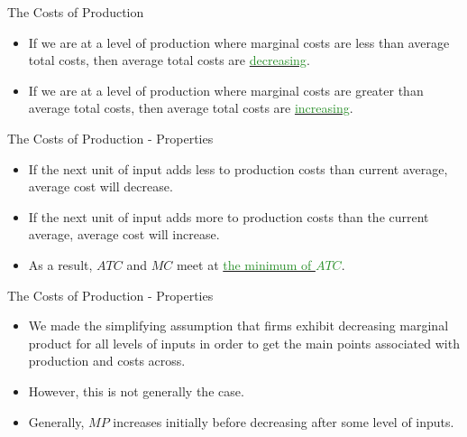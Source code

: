\documentclass[xcolor={dvipsnames},pdf, hyperref={colorlinks=true, citecolor=ForestGreen, linkcolor=BlueViolet, urlcolor=Magenta}]{beamer}
\newcommand{\dd}[1]{{\underline{\textcolor{ForestGreen}{#1}}}}
\begin{document}
\begin{frame}{The Costs of Production}
\begin{itemize}
	\item If we are at a level of production where marginal costs are less than average total costs, then average total costs are \dd{decreasing}.
	\item If we are at a level of production where marginal costs are greater than average total costs, then average total costs are \dd{increasing}.
\end{itemize}
\end{frame}

\begin{frame}{The Costs of Production - Properties}
	\begin{itemize}
		\item If the next unit of input adds less to production costs than current average, average cost will decrease. 
		\item If the next unit of input adds more to production costs than the current average, average cost will increase.
		\item As a result, $ATC$ and $MC$ meet at \dd{the minimum of $ATC$}.
	\end{itemize}
\end{frame}

\begin{frame}{The Costs of Production - Properties}
\begin{itemize}
	\item We made the simplifying assumption that firms exhibit decreasing marginal product for all levels of inputs in order to get the main points associated with production and costs across. 
	\item However, this is not generally the case. 
	\item Generally, $MP$ increases initially before decreasing after some level of inputs.
\end{itemize}
\end{frame}
\end{document}
